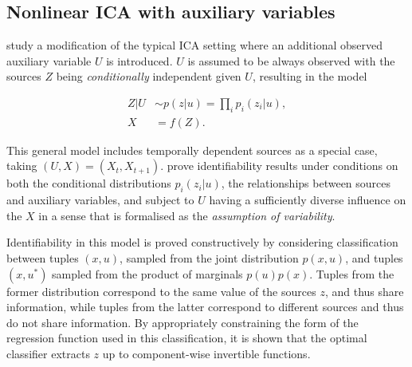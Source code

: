 





\subsection{Nonlinear ICA with auxiliary variables}\label{subsec:ica-literature-nonlinear-ica-with-aux}

\cite{hyvarinen19a} study a modification of the typical ICA setting where an additional observed auxiliary variable $U$ is introduced.
$U$ is assumed to be always observed with the sources $Z$ being \emph{conditionally} independent given $U$, resulting in the model


\begin{align}
Z | U &\sim p(z|u) = \prod_{i} p_i(z_i | u), \\
X &= f(Z).
\end{align}

This general model includes temporally dependent sources as a special case, taking $(U, X)= (X_t,X_{t+1})$.
\cite{hyvarinen19a} prove identifiability results under conditions on both the conditional distributions $p_i(z_i | u)$, the relationships between sources and auxiliary variables, and subject to $U$ having a sufficiently diverse influence on the $X$ in a sense that is formalised as the \emph{assumption of variability}.

Identifiability in this model is proved constructively by considering classification between tuples $(x, u)$, sampled from the joint distribution $p(x, u)$, and tuples $(x, u^*)$ sampled from the product of marginals $p(u)p(x)$.
Tuples from the former distribution correspond to the same value of the sources $z$, and thus share information, while tuples from the latter correspond to different sources and thus do not share information.
By appropriately constraining the form of the regression function used in this classification, it is shown that the optimal classifier extracts $z$ up to component-wise invertible functions.

